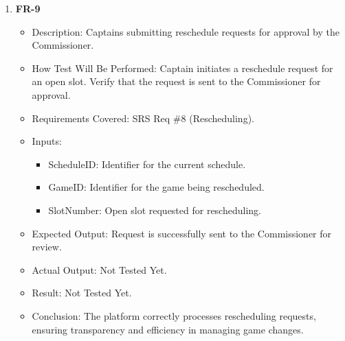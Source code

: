 \documentclass[12pt, titlepage]{article}
\begin{document}
\begin{enumerate}
      \item \textbf{FR-9}  
      \begin{itemize}
          \item Description: Captains submitting reschedule requests for approval by the Commissioner.
          \item How Test Will Be Performed: Captain initiates a reschedule request for an open slot. Verify that the request is sent to the Commissioner for approval.
          \item Requirements Covered: SRS Req \#8 (Rescheduling).
          \item Inputs:  
              \begin{itemize}
                  \item ScheduleID: Identifier for the current schedule.  
                  \item GameID: Identifier for the game being rescheduled.  
                  \item SlotNumber: Open slot requested for rescheduling.  
              \end{itemize}
          \item Expected Output: Request is successfully sent to the Commissioner for review.
          \item Actual Output: Not Tested Yet.
          \item Result: Not Tested Yet.
          \item Conclusion: The platform correctly processes rescheduling requests, ensuring transparency and efficiency in managing game changes.
      \end{itemize}


\end{enumerate}
\end{document}
